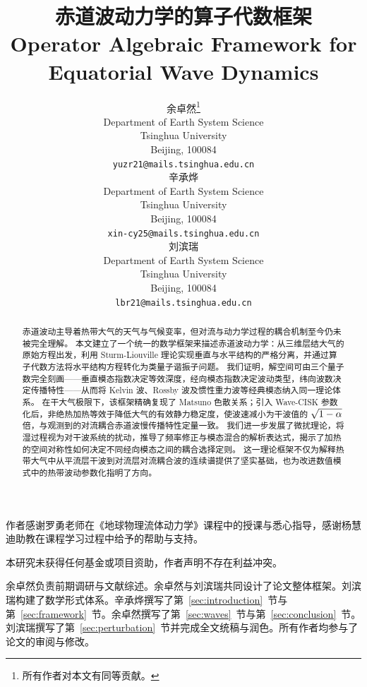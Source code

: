 \documentclass{article}
\title{赤道波动力学的算子代数框架 \vspace{0.25em} \\ Operator Algebraic Framework for \\ Equatorial Wave Dynamics}
\author{%
  余卓然\thanks{所有作者对本文有同等贡献。} \\
  Department of Earth System Science \\
  Tsinghua University \\
  Beijing, 100084 \\
  \texttt{yuzr21@mails.tsinghua.edu.cn} \\
  \And
  辛承烨\footnotemark[1] \\
  Department of Earth System Science \\
  Tsinghua University \\
  Beijing, 100084 \\
  \texttt{xin-cy25@mails.tsinghua.edu.cn} \\
  \AND
  刘滨瑞\footnotemark[1] \\
  Department of Earth System Science \\
  Tsinghua University \\
  Beijing, 100084 \\
  \texttt{lbr21@mails.tsinghua.edu.cn} \\
}
\begin{document}
\maketitle
{}



\begin{abstract}
  赤道波动主导着热带大气的天气与气候变率，但对流与动力学过程的耦合机制至今仍未被完全理解。
  本文建立了一个统一的数学框架来描述赤道波动力学：从三维层结大气的原始方程出发，利用 Sturm-Liouville 理论实现垂直与水平结构的严格分离，并通过算子代数方法将水平结构方程转化为类量子谐振子问题。
  我们证明，解空间可由三个量子数完全刻画——垂直模态指数决定等效深度，经向模态指数决定波动类型，纬向波数决定传播特性——从而将 Kelvin 波、Rossby 波及惯性重力波等经典模态纳入同一理论体系。
  在干大气极限下，该框架精确复现了 Matsuno 色散关系；引入 Wave-CISK 参数化后，非绝热加热等效于降低大气的有效静力稳定度，使波速减小为干波值的 $\sqrt{1-\alpha}$ 倍，与观测到的对流耦合赤道波慢传播特性定量一致。
  我们进一步发展了微扰理论，将湿过程视为对干波系统的扰动，推导了频率修正与模态混合的解析表达式，揭示了加热的空间对称性如何决定不同经向模态之间的耦合选择定则。
  这一理论框架不仅为解释热带大气中从平流层干波到对流层对流耦合波的连续谱提供了坚实基础，也为改进数值模式中的热带波动参数化指明了方向。
\end{abstract}























\begin{ack}
作者感谢罗勇老师在《地球物理流体动力学》课程中的授课与悉心指导，感谢杨慧迪助教在课程学习过程中给予的帮助与支持。

本研究未获得任何基金或项目资助，作者声明不存在利益冲突。
\end{ack}



\begin{authcontrib}
余卓然负责前期调研与文献综述。余卓然与刘滨瑞共同设计了论文整体框架。刘滨瑞构建了数学形式体系。辛承烨撰写了第~\ref{sec:introduction}~节与第~\ref{sec:framework}~节。余卓然撰写了第~\ref{sec:waves}~节与第~\ref{sec:conclusion}~节。刘滨瑞撰写了第~\ref{sec:perturbation}~节并完成全文统稿与润色。所有作者均参与了论文的审阅与修改。
\end{authcontrib}
\end{document}
